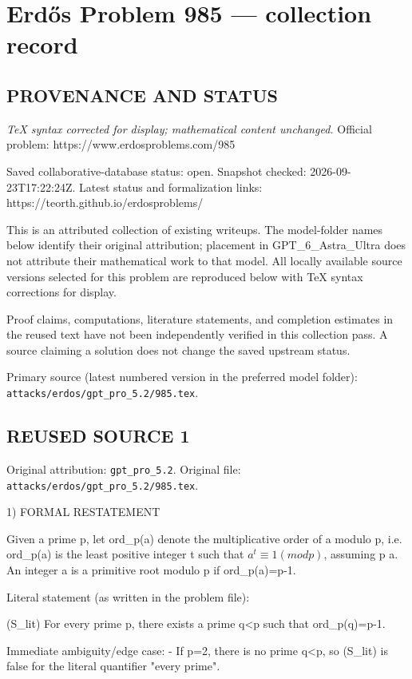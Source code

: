 \section*{Erd\H{o}s Problem 985 --- collection record}

\subsection*{PROVENANCE AND STATUS}

\emph{TeX syntax corrected for display; mathematical content unchanged.}
Official problem: https://www.erdosproblems.com/985

Saved collaborative-database status: open.
Snapshot checked: 2026-09-23T17:22:24Z.
Latest status and formalization links: https://teorth.github.io/erdosproblems/

This is an attributed collection of existing writeups. The model-folder names below identify their original attribution; placement in GPT\_6\_Astra\_Ultra does not attribute their mathematical work to that model. All locally available source versions selected for this problem are reproduced below with TeX syntax corrections for display.

Proof claims, computations, literature statements, and completion estimates in the reused text have not been independently verified in this collection pass. A source claiming a solution does not change the saved upstream status.

Primary source (latest numbered version in the preferred model folder): \texttt{attacks/erdos/gpt\_pro\_5.2/985.tex}.

\subsection*{REUSED SOURCE 1}
Original attribution: \texttt{gpt\_pro\_5.2}.
Original file: \texttt{attacks/erdos/gpt\_pro\_5.2/985.tex}.


1) FORMAL RESTATEMENT

Given a prime p, let ord_p(a) denote the multiplicative order of a modulo p, i.e.
ord_p(a) is the least positive integer t such that \(a^t \equiv 1 (mod p)\), assuming p \nmid a.
An integer a is a primitive root modulo p if ord_p(a)=p-1.

Literal statement (as written in the problem file):

  (S_lit)  For every prime p, there exists a prime q<p such that ord_p(q)=p-1.

Immediate ambiguity/edge case:
- If p=2, there is no prime q<p, so (S_lit) is false for the literal quantifier "every prime".

